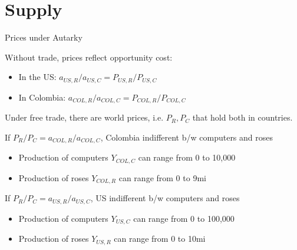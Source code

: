 \documentclass[notes,11pt, aspectratio=169, xcolor=table]{beamer}
\newenvironment{wideitemize}{\itemize\addtolength{\itemsep}{10pt}}{\enditemize}
\begin{document}
\section{Supply}

\begin{frame}{Prices under Autarky}

\begin{wideitemize}

    \item Without trade, prices reflect opportunity cost:
    \begin{itemize}
        \item In the US: $a_{US,R}/a_{US,C} = P_{US,R}/P_{US,C}$
        \item In Colombia: $a_{COL,R}/a_{COL,C} = P_{COL,R}/P_{COL,C}$
    \end{itemize}

    \item Under free trade, there are world prices, i.e. $P_R,P_C$ that hold both in countries. 

    \item If $P_R/P_C = a_{COL,R}/a_{COL,C}$, Colombia indifferent b/w computers and roses
    \begin{itemize}
        \item Production of computers $Y_{COL,C}$ can range from 0 to 10,000 
        \item Production of roses $Y_{COL,R}$ can range from 0 to 9mi 
    \end{itemize}

    \item If $P_R/P_C = a_{US,R}/a_{US,C}$, US indifferent b/w computers and roses
    \begin{itemize}
        \item Production of computers $Y_{US,C}$ can range from 0 to 100,000 
        \item Production of roses $Y_{US,R}$ can range from 0 to 10mi 
    \end{itemize}

\end{wideitemize}

\end{frame}
\end{document}
